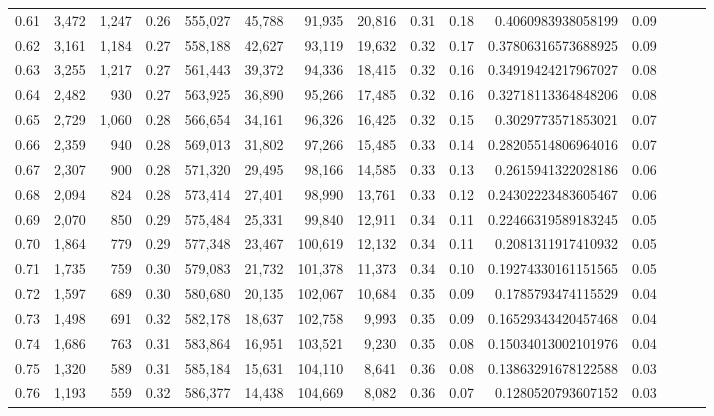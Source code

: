\begin{tabular}{rrrrrrrrrrrrrrr}
0.61 &   3,472 &  1,247 &  0.26 &  555,027 &   45,788 &   91,935 &   20,816 &  0.31 &  0.18 &    0.4060983938058199 &      0.09 \\
0.62 &   3,161 &  1,184 &  0.27 &  558,188 &   42,627 &   93,119 &   19,632 &  0.32 &  0.17 &   0.37806316573688925 &      0.09 \\
0.63 &   3,255 &  1,217 &  0.27 &  561,443 &   39,372 &   94,336 &   18,415 &  0.32 &  0.16 &   0.34919424217967027 &      0.08 \\
0.64 &   2,482 &    930 &  0.27 &  563,925 &   36,890 &   95,266 &   17,485 &  0.32 &  0.16 &   0.32718113364848206 &      0.08 \\
0.65 &   2,729 &  1,060 &  0.28 &  566,654 &   34,161 &   96,326 &   16,425 &  0.32 &  0.15 &    0.3029773571853021 &      0.07 \\
0.66 &   2,359 &    940 &  0.28 &  569,013 &   31,802 &   97,266 &   15,485 &  0.33 &  0.14 &   0.28205514806964016 &      0.07 \\
0.67 &   2,307 &    900 &  0.28 &  571,320 &   29,495 &   98,166 &   14,585 &  0.33 &  0.13 &    0.2615941322028186 &      0.06 \\
0.68 &   2,094 &    824 &  0.28 &  573,414 &   27,401 &   98,990 &   13,761 &  0.33 &  0.12 &   0.24302223483605467 &      0.06 \\
0.69 &   2,070 &    850 &  0.29 &  575,484 &   25,331 &   99,840 &   12,911 &  0.34 &  0.11 &   0.22466319589183245 &      0.05 \\
0.70 &   1,864 &    779 &  0.29 &  577,348 &   23,467 &  100,619 &   12,132 &  0.34 &  0.11 &    0.2081311917410932 &      0.05 \\
0.71 &   1,735 &    759 &  0.30 &  579,083 &   21,732 &  101,378 &   11,373 &  0.34 &  0.10 &   0.19274330161151565 &      0.05 \\
0.72 &   1,597 &    689 &  0.30 &  580,680 &   20,135 &  102,067 &   10,684 &  0.35 &  0.09 &    0.1785793474115529 &      0.04 \\
0.73 &   1,498 &    691 &  0.32 &  582,178 &   18,637 &  102,758 &    9,993 &  0.35 &  0.09 &   0.16529343420457468 &      0.04 \\
0.74 &   1,686 &    763 &  0.31 &  583,864 &   16,951 &  103,521 &    9,230 &  0.35 &  0.08 &   0.15034013002101976 &      0.04 \\
0.75 &   1,320 &    589 &  0.31 &  585,184 &   15,631 &  104,110 &    8,641 &  0.36 &  0.08 &   0.13863291678122588 &      0.03 \\
0.76 &   1,193 &    559 &  0.32 &  586,377 &   14,438 &  104,669 &    8,082 &  0.36 &  0.07 &    0.1280520793607152 &      0.03 \\

\end{tabular}

